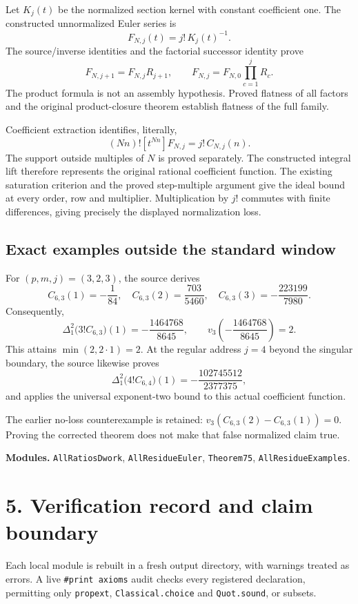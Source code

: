 \documentclass[11pt]{article}
\begin{document}
Let $K_j(t)$ be the normalized section kernel with constant coefficient one. The constructed unnormalized Euler series is
\[
 F_{N,j}(t)=j!\,K_j(t)^{-1}.
\]
The source/inverse identities and the factorial successor identity prove
\[
 F_{N,j+1}=F_{N,j}R_{j+1},\qquad
 F_{N,j}=F_{N,0}\prod_{c=1}^{j}R_c.
\]
The product formula is not an assembly hypothesis. Proved flatness of all factors and the original product-closure theorem establish flatness of the full family.

Coefficient extraction identifies, literally,
\[
 (Nn)![t^{Nn}]F_{N,j}=j!\,C_{N,j}(n).
\]
The support outside multiples of $N$ is proved separately. The constructed integral lift therefore represents the original rational coefficient function. The existing saturation criterion and the proved step-multiple argument give the ideal bound at every order, row and multiplier. Multiplication by $j!$ commutes with finite differences, giving precisely the displayed normalization loss.

\subsection*{Exact examples outside the standard window}
For $(p,m,j)=(3,2,3)$, the source derives
\[
 C_{6,3}(1)=-\frac1{84},\quad C_{6,3}(2)=\frac{703}{5460},\quad
 C_{6,3}(3)=-\frac{223199}{7980}.
\]
Consequently,
\[
 \Delta_1^2\bigl(3!C_{6,3}\bigr)(1)=-\frac{1464768}{8645},\qquad
 v_3\!\left(-\frac{1464768}{8645}\right)=2.
\]
This attains $\min(2,2\cdot1)=2$. At the regular address $j=4$ beyond the singular boundary, the source likewise proves
\[
 \Delta_1^2\bigl(4!C_{6,4}\bigr)(1)=-\frac{102745512}{2377375},
\]
and applies the universal exponent-two bound to this actual coefficient function.

The earlier no-loss counterexample is retained: $v_3(C_{6,3}(2)-C_{6,3}(1))=0$. Proving the corrected theorem does not make that false normalized claim true.

\textbf{Modules.} \texttt{AllRatiosDwork}, \texttt{AllResidueEuler}, \texttt{Theorem75}, \texttt{AllResidueExamples}.
\newpage
\section*{5. Verification record and claim boundary}
Each local module is rebuilt in a fresh output directory, with warnings treated as errors. A live \texttt{\#print axioms} audit checks every registered declaration, permitting only \texttt{propext}, \texttt{Classical.choice} and \texttt{Quot.sound}, or subsets.
\end{document}
